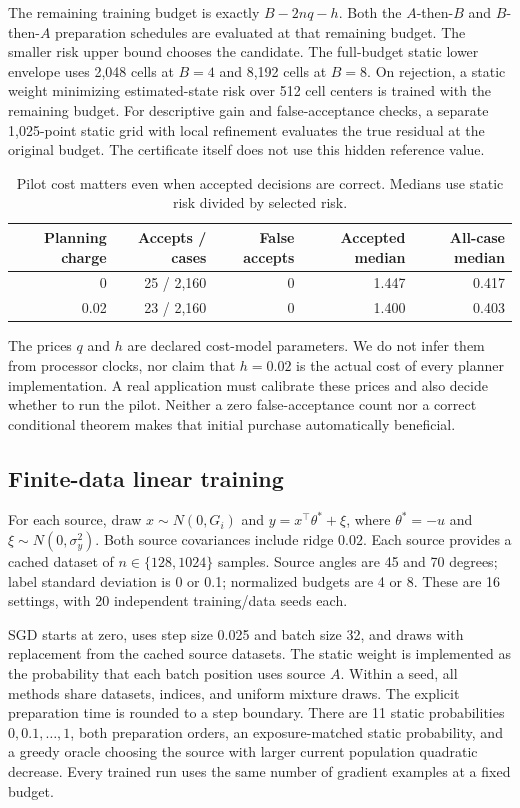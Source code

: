 The remaining training budget is exactly $B-2nq-h$. Both the $A$-then-$B$ and $B$-then-$A$ preparation schedules are evaluated at that remaining budget. The smaller risk upper bound chooses the candidate. The full-budget static lower envelope uses 2,048 cells at $B=4$ and 8,192 cells at $B=8$. On rejection, a static weight minimizing estimated-state risk over 512 cell centers is trained with the remaining budget. For descriptive gain and false-acceptance checks, a separate 1,025-point static grid with local refinement evaluates the true residual at the original budget. The certificate itself does not use this hidden reference value.

\begin{table}[h]
\centering\small
\caption{Pilot cost matters even when accepted decisions are correct. Medians use static risk divided by selected risk.}\label{tab:pilot}
\begin{tabular}{rrrrr}\toprule
Planning charge & Accepts / cases & False accepts & Accepted median & All-case median\\\midrule
0 & 25 / 2,160 & 0 & 1.447 & 0.417\\
0.02 & 23 / 2,160 & 0 & 1.400 & 0.403\\
\bottomrule\end{tabular}
\end{table}

The prices $q$ and $h$ are declared cost-model parameters. We do not infer them from processor clocks, nor claim that $h=0.02$ is the actual cost of every planner implementation. A real application must calibrate these prices and also decide whether to run the pilot. Neither a zero false-acceptance count nor a correct conditional theorem makes that initial purchase automatically beneficial.

\subsection{Finite-data linear training}
For each source, draw $x\sim N(0,G_i)$ and $y=x^\top\theta^*+\xi$, where $\theta^*=-u$ and $\xi\sim N(0,\sigma_y^2)$. Both source covariances include ridge $0.02$. Each source provides a cached dataset of $n\in\{128,1024\}$ samples. Source angles are 45 and 70 degrees; label standard deviation is 0 or 0.1; normalized budgets are 4 or 8. These are 16 settings, with 20 independent training/data seeds each.

SGD starts at zero, uses step size 0.025 and batch size 32, and draws with replacement from the cached source datasets. The static weight is implemented as the probability that each batch position uses source $A$. Within a seed, all methods share datasets, indices, and uniform mixture draws. The explicit preparation time is rounded to a step boundary. There are 11 static probabilities $0,0.1,\ldots,1$, both preparation orders, an exposure-matched static probability, and a greedy oracle choosing the source with larger current population quadratic decrease. Every trained run uses the same number of gradient examples at a fixed budget.

